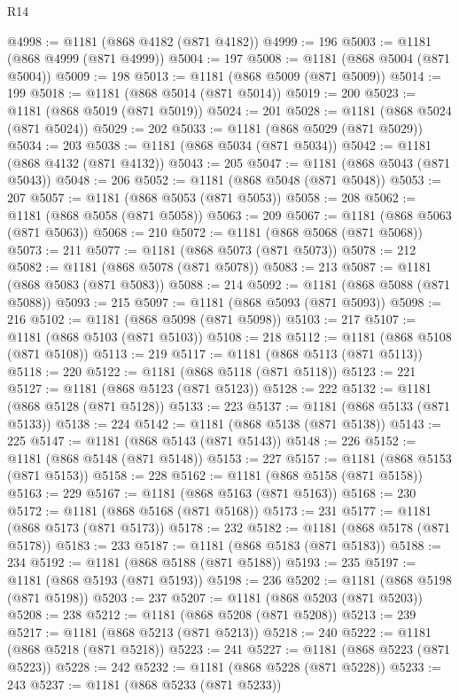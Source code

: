 \begin{lexlean}{R14}
\begin{coremodule}
@4998 := @1181 (@868 @4182 (@871 @4182))
@4999 := 196
@5003 := @1181 (@868 @4999 (@871 @4999))
@5004 := 197
@5008 := @1181 (@868 @5004 (@871 @5004))
@5009 := 198
@5013 := @1181 (@868 @5009 (@871 @5009))
@5014 := 199
@5018 := @1181 (@868 @5014 (@871 @5014))
@5019 := 200
@5023 := @1181 (@868 @5019 (@871 @5019))
@5024 := 201
@5028 := @1181 (@868 @5024 (@871 @5024))
@5029 := 202
@5033 := @1181 (@868 @5029 (@871 @5029))
@5034 := 203
@5038 := @1181 (@868 @5034 (@871 @5034))
@5042 := @1181 (@868 @4132 (@871 @4132))
@5043 := 205
@5047 := @1181 (@868 @5043 (@871 @5043))
@5048 := 206
@5052 := @1181 (@868 @5048 (@871 @5048))
@5053 := 207
@5057 := @1181 (@868 @5053 (@871 @5053))
@5058 := 208
@5062 := @1181 (@868 @5058 (@871 @5058))
@5063 := 209
@5067 := @1181 (@868 @5063 (@871 @5063))
@5068 := 210
@5072 := @1181 (@868 @5068 (@871 @5068))
@5073 := 211
@5077 := @1181 (@868 @5073 (@871 @5073))
@5078 := 212
@5082 := @1181 (@868 @5078 (@871 @5078))
@5083 := 213
@5087 := @1181 (@868 @5083 (@871 @5083))
@5088 := 214
@5092 := @1181 (@868 @5088 (@871 @5088))
@5093 := 215
@5097 := @1181 (@868 @5093 (@871 @5093))
@5098 := 216
@5102 := @1181 (@868 @5098 (@871 @5098))
@5103 := 217
@5107 := @1181 (@868 @5103 (@871 @5103))
@5108 := 218
@5112 := @1181 (@868 @5108 (@871 @5108))
@5113 := 219
@5117 := @1181 (@868 @5113 (@871 @5113))
@5118 := 220
@5122 := @1181 (@868 @5118 (@871 @5118))
@5123 := 221
@5127 := @1181 (@868 @5123 (@871 @5123))
@5128 := 222
@5132 := @1181 (@868 @5128 (@871 @5128))
@5133 := 223
@5137 := @1181 (@868 @5133 (@871 @5133))
@5138 := 224
@5142 := @1181 (@868 @5138 (@871 @5138))
@5143 := 225
@5147 := @1181 (@868 @5143 (@871 @5143))
@5148 := 226
@5152 := @1181 (@868 @5148 (@871 @5148))
@5153 := 227
@5157 := @1181 (@868 @5153 (@871 @5153))
@5158 := 228
@5162 := @1181 (@868 @5158 (@871 @5158))
@5163 := 229
@5167 := @1181 (@868 @5163 (@871 @5163))
@5168 := 230
@5172 := @1181 (@868 @5168 (@871 @5168))
@5173 := 231
@5177 := @1181 (@868 @5173 (@871 @5173))
@5178 := 232
@5182 := @1181 (@868 @5178 (@871 @5178))
@5183 := 233
@5187 := @1181 (@868 @5183 (@871 @5183))
@5188 := 234
@5192 := @1181 (@868 @5188 (@871 @5188))
@5193 := 235
@5197 := @1181 (@868 @5193 (@871 @5193))
@5198 := 236
@5202 := @1181 (@868 @5198 (@871 @5198))
@5203 := 237
@5207 := @1181 (@868 @5203 (@871 @5203))
@5208 := 238
@5212 := @1181 (@868 @5208 (@871 @5208))
@5213 := 239
@5217 := @1181 (@868 @5213 (@871 @5213))
@5218 := 240
@5222 := @1181 (@868 @5218 (@871 @5218))
@5223 := 241
@5227 := @1181 (@868 @5223 (@871 @5223))
@5228 := 242
@5232 := @1181 (@868 @5228 (@871 @5228))
@5233 := 243
@5237 := @1181 (@868 @5233 (@871 @5233))

\end{coremodule}
\end{lexlean}
